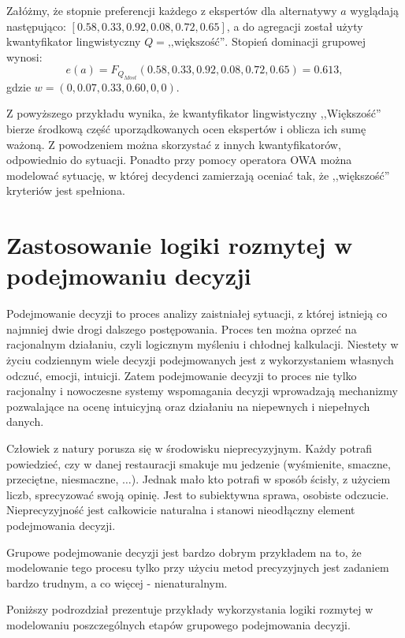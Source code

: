 \begin{example}
Załóżmy, że stopnie preferencji każdego z ekspertów dla alternatywy $a$
wyglądają następująco: $[0.58, 0.33, 0.92, 0.08, 0.72, 0.65]$, a do agregacji
został użyty kwantyfikator lingwistyczny $Q = \textrm{,,większość''}$. Stopień
dominacji grupowej wynosi:
$$e(a) = F_{Q_{Most}}(0.58, 0.33, 0.92, 0.08, 0.72, 0.65) = 0.613,$$
gdzie $w=(0, 0.07, 0.33, 0.60, 0, 0).$
\end{example}

Z powyższego przykładu wynika, że kwantyfikator lingwistyczny ,,Większość''
bierze środkową część uporządkowanych ocen ekspertów i oblicza ich sumę ważoną.
Z powodzeniem można skorzystać z innych kwantyfikatorów, odpowiednio do
sytuacji. Ponadto przy pomocy operatora OWA można modelować sytuację, w której
decydenci zamierzają oceniać tak, że ,,większość'' kryteriów jest spełniona.

\section{Zastosowanie logiki rozmytej w podejmowaniu decyzji}
Podejmowanie decyzji to proces analizy zaistniałej sytuacji, z której istnieją 
co najmniej dwie drogi dalszego postępowania. Proces ten można oprzeć na 
racjonalnym działaniu, czyli logicznym myśleniu i chłodnej kalkulacji. Niestety 
w życiu codziennym wiele decyzji podejmowanych jest z wykorzystaniem własnych 
odczuć, emocji, intuicji. Zatem podejmowanie decyzji to proces nie tylko 
racjonalny i nowoczesne systemy wspomagania decyzji wprowadzają mechanizmy 
pozwalające na ocenę intuicyjną oraz działaniu na niepewnych i niepełnych 
danych.

Człowiek z natury porusza się w środowisku nieprecyzyjnym. Każdy potrafi 
powiedzieć, czy w danej restauracji smakuje mu jedzenie (wyśmienite, smaczne,
przeciętne, niesmaczne, $\dotsc$). Jednak mało kto potrafi w sposób ścisły, z
użyciem liczb, sprecyzować swoją opinię. Jest to subiektywna sprawa, osobiste
odczucie. Nieprecyzyjność jest całkowicie naturalna i stanowi nieodłączny
element podejmowania decyzji.

Grupowe podejmowanie decyzji jest bardzo dobrym przykładem na to, że 
modelowanie tego procesu tylko przy użyciu metod precyzyjnych jest zadaniem 
bardzo trudnym, a co więcej - nienaturalnym.

Poniższy podrozdział prezentuje przykłady wykorzystania logiki rozmytej w 
modelowaniu poszczególnych etapów grupowego podejmowania decyzji.

